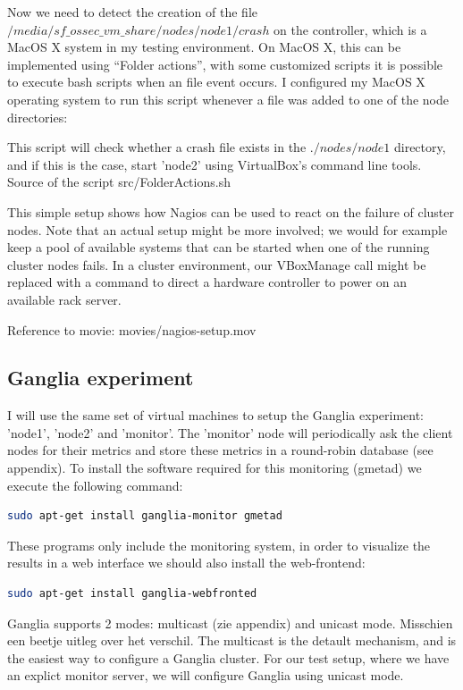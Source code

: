 \documentclass[12pt]{report}
\begin{document}
Now we need to detect the creation of the file
$/media/sf\_ossec\_vm\_share/nodes/node1/crash$  on the controller,
which is a MacOS X system in my testing environment. On MacOS X, this
can be implemented using ``Folder actions'', with some customized scripts
\cite{folder_actions_bash} it is possible to execute bash scripts when
an file event occurs.
I configured my MacOS X operating system to run this script whenever a
file was added to one of the node directories:

This script will check whether a crash file exists in the $./nodes/node1$
directory, and if this is the case, start 'node2' using VirtualBox's
command line tools. 
Source of the script src/FolderActions.sh

This simple setup shows how Nagios can be used to react on the failure
of cluster nodes. Note that an actual setup might be more
involved; we would for example keep a pool of available systems that
can be started when one of the running cluster nodes fails. In a
cluster environment, our VBoxManage call might be replaced with a
command to direct a hardware controller to power on an available rack
server.

Reference to movie: movies/nagios-setup.mov

\subsection{Ganglia experiment}
I will use the same set of virtual machines to setup the Ganglia
experiment: 'node1', 'node2' and 'monitor'.
The 'monitor' node will periodically ask the client nodes for their
metrics and store these metrics in a round-robin database (see
appendix).
To install the software required for this monitoring (gmetad) we execute the
following command:
\begin{lstlisting}[language=bash]
sudo apt-get install ganglia-monitor gmetad
\end{lstlisting} 

These programs only include the monitoring system, in order to
visualize the results in a web interface we should also install the
web-frontend:
\begin{lstlisting}[language=bash]
sudo apt-get install ganglia-webfronted
\end{lstlisting} 

Ganglia supports 2 modes: multicast (zie appendix) and unicast mode.
Misschien een beetje uitleg over het verschil.
The multicast is the detault mechanism, and is the easiest way to
configure a Ganglia cluster.
For our test setup, where we have an explict monitor server, we will
configure Ganglia using unicast mode.
\end{document}
